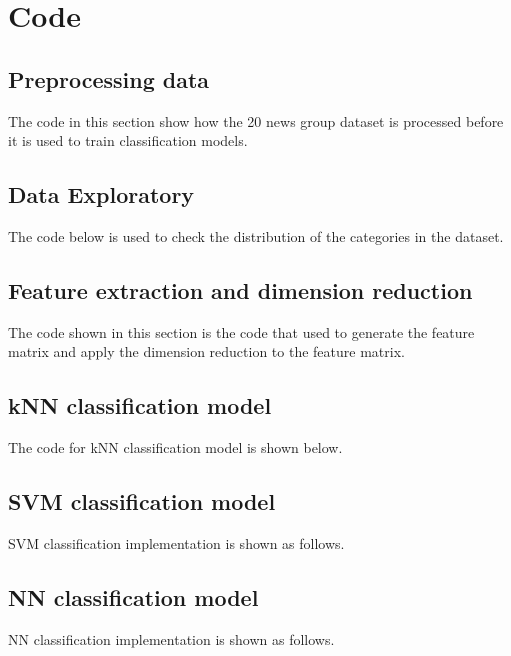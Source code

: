 \chapter{Code}

\section{Preprocessing data}
The code in this section show how the 20 news group dataset is processed before it is used to train classification models.\\



\section{Data Exploratory}
The code below is used to check the distribution of the categories in the dataset.\\



\section{Feature extraction and dimension reduction}
The code shown in this section is the code that used to generate the feature matrix and apply the dimension reduction to the feature matrix.\\



\section{kNN classification model}
The code for kNN classification model is shown below.\\



\section{SVM classification model}
SVM classification implementation is shown as follows.\\



\section{NN classification model}
NN classification implementation is shown as follows.\\


